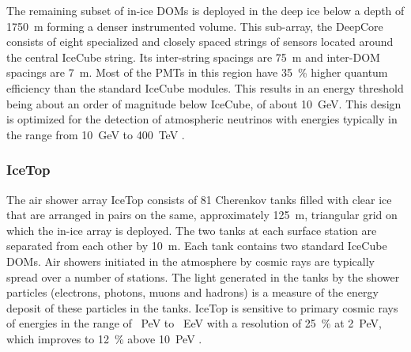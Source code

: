 The remaining subset of in-ice DOMs is deployed in the deep ice below a depth of \SI{1750}{\meter} forming a denser instrumented volume. This sub-array, the DeepCore \cite{ICECUBE:DC} consists of eight specialized and closely spaced strings of sensors located around the central IceCube string. 
Its inter-string spacings are \SI{75}{\meter} and inter-DOM spacings are \SI{7}{\meter}.
Most of the PMTs in this region have \SI{35}{\%} higher quantum efficiency than the standard IceCube modules. This results in an energy threshold being about an order of magnitude below IceCube, of about \SI{10}{\giga\electronvolt}. This design is optimized for the detection of atmospheric neutrinos with energies typically in the range from \SI{10}{\giga\electronvolt} to \SI{400}{\tera\electronvolt} \cite{ICECUBE:AtmNu}.


\subsubsection{IceTop}

The air shower array IceTop \cite{ICECUBE:IceTop} consists of \num{81} Cherenkov tanks filled with clear ice that are arranged in pairs on the same, approximately \SI{125}{\meter}, triangular grid on which the in-ice array is deployed. The two tanks at each surface station are separated from each other by \SI{10}{\meter}. Each tank contains two standard IceCube DOMs. Air showers initiated in the atmosphere by cosmic rays are typically spread over a number of stations. The light generated in the tanks by the shower particles (electrons, photons, muons and hadrons) is a measure of the energy deposit of these particles in the tanks. IceTop is sensitive to primary cosmic rays of energies in the range of \SI{}{PeV} to \SI{}{EeV}  with a resolution of \SI{25}{\%} at \SI{2}{PeV}, which improves to \SI{12}{\%} above \SI{10}{PeV} \cite{IT:measurement}.




